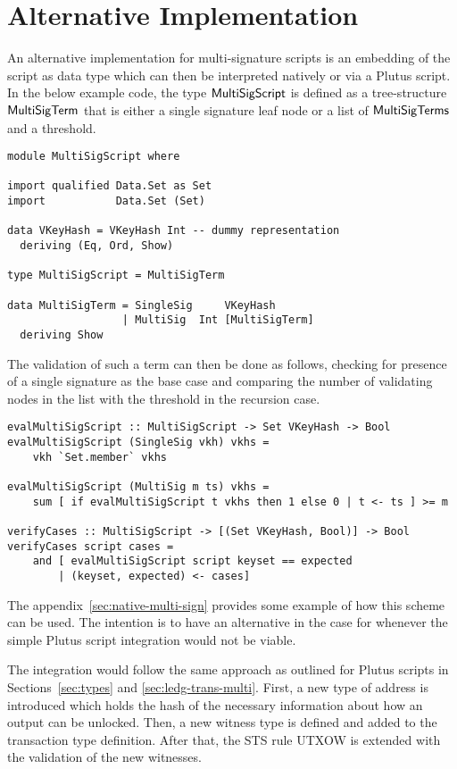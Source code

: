 \documentclass[11pt,a4paper,dvipsnames]{article}
\theoremstyle{definition}
\begin{document}
\section{Alternative Implementation}
\label{sec:altern-impl}

An alternative implementation for multi-signature scripts is an embedding of the
script as data type which can then be interpreted natively or via a Plutus
script. In the below example code, the type $\mathsf{MultiSigScript}$ is defined
as a tree-structure $\mathsf{MultiSigTerm}$ that is either a single signature leaf
node or a list of $\mathsf{MultiSigTerms}$ and a threshold.

\begin{verbatim}
module MultiSigScript where

import qualified Data.Set as Set
import           Data.Set (Set)

data VKeyHash = VKeyHash Int -- dummy representation
  deriving (Eq, Ord, Show)

type MultiSigScript = MultiSigTerm

data MultiSigTerm = SingleSig     VKeyHash
                  | MultiSig  Int [MultiSigTerm]
  deriving Show
\end{verbatim}

The validation of such a term can then be done as follows, checking for presence
of a single signature as the base case and comparing the number of validating
nodes in the list with the threshold in the recursion case.

\begin{verbatim}
evalMultiSigScript :: MultiSigScript -> Set VKeyHash -> Bool
evalMultiSigScript (SingleSig vkh) vkhs =
    vkh `Set.member` vkhs

evalMultiSigScript (MultiSig m ts) vkhs =
    sum [ if evalMultiSigScript t vkhs then 1 else 0 | t <- ts ] >= m

verifyCases :: MultiSigScript -> [(Set VKeyHash, Bool)] -> Bool
verifyCases script cases =
    and [ evalMultiSigScript script keyset == expected
        | (keyset, expected) <- cases]
\end{verbatim}

The appendix~\ref{sec:native-multi-sign} provides some example of how this
scheme can be used. The intention is to have an alternative in the case for
whenever the simple Plutus script integration would not be viable.

The integration would follow the same approach as outlined for Plutus scripts in
Sections~\ref{sec:types} and \ref{sec:ledg-trans-multi}. First, a new type of
address is introduced which holds the hash of the necessary information about
how an output can be unlocked. Then, a new witness type is defined and added to
the transaction type definition. After that, the STS rule UTXOW is extended with
the validation of the new witnesses.
\end{document}
